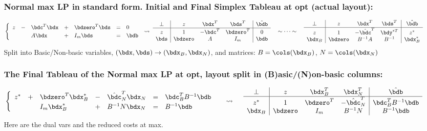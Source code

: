 \documentclass[a4paper]{article}
\begin{document}
\subsubsection*{Normal max LP in standard form. Initial and Final Simplex Tableau at opt (actual layout):}%
\[
  \begin{cases}
    \begin{array}[m]{*{5}{lc}}
    z &-& \bdc^T\bdx &+& \bdzero^T\bds &=&  0   \cr
      & &   A\bdx    &+&   I_m\bds     &=& \bdb \cr
    \end{array}
  \end{cases}
  \mkern-16mu\rightsquigarrow\;
    \begin{array}[m]{c|ccc|c}
 \perp &     z   & \bdx^T & \bds^T     & \hat\bdb \cr\hline\rule{0pt}{10pt}
    z  &     1   &-\bdc^T & \bdzero^T  &   0    \cr %
 \bds  & \bdzero & A      & I_m        & \bdb   \cr
    \end{array}
  \quad\sim\cdots\sim\quad
    \begin{array}[m]{c|ccc|c}
 \perp &     z   &     \bdx^T &     \bds^T   & \hat\bdb \cr\hline\rule{0pt}{10pt}
 z  &     1   &-\hat\bdc^T &     \bdy^{*T} & z^*\cr %
 \bdx_B& \bdzero &     B^{-1}A&     B^{-1}   & \bdx_B^*   \cr
    \end{array}
\]
Split into Basic/Non-basic variables,
$(\bdx,\bds)\to(\bdx_B,\bdx_N)$,
 and matrices:
    $B=\cols(\bdx_B)$,
    $N=\cols(\bdx_N)$

\subsubsection*{The Final Tableau of the Normal max LP at opt, layout split in (B)asic/(N)on-basic columns:}%
\[
  \begin{cases}
    \begin{array}[m]{*{5}{lc}}
      z^* &+& \bdzero^T\bdx_B^* &-& \hat\bdc_N^T\bdx_N &=&  \bdc_B^TB^{-1}\bdb \cr
      & &    I_m\bdx_B^*  &+& B^{-1}N\bdx_N     &=& B^{-1}\bdb \cr
    \end{array}
  \end{cases}
  \;\rightsquigarrow\quad\;
    \begin{array}[m]{c|ccc|c}
   \perp &     z   & \bdx_B^T  & \bdx_N^T & \hat\bdb \cr\hline\rule{0pt}{10pt}
      z^*&     1   & \bdzero^T &-\hat\bdc_N^T & \bdc_B^TB^{-1}\bdb \cr %
  \bdx_B & \bdzero &  I_m  & B^{-1}N      &  B^{-1}\bdb   \cr
    \end{array}
\]
Here  are the dual vars and
 the reduced costs at max.
\end{document}
